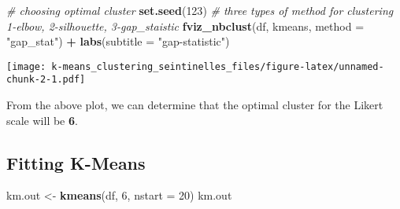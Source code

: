 \documentclass[
]{article}
\newenvironment{Shaded}{\begin{snugshade}}{\end{snugshade}}
\newcommand{\AttributeTok}[1]{\textcolor[rgb]{0.13,0.29,0.53}{#1}}
\newcommand{\CommentTok}[1]{\textcolor[rgb]{0.56,0.35,0.01}{\textit{#1}}}
\newcommand{\DecValTok}[1]{\textcolor[rgb]{0.00,0.00,0.81}{#1}}
\newcommand{\FunctionTok}[1]{\textcolor[rgb]{0.13,0.29,0.53}{\textbf{#1}}}
\newcommand{\NormalTok}[1]{#1}
\newcommand{\OtherTok}[1]{\textcolor[rgb]{0.56,0.35,0.01}{#1}}
\newcommand{\SpecialCharTok}[1]{\textcolor[rgb]{0.81,0.36,0.00}{\textbf{#1}}}
\newcommand{\StringTok}[1]{\textcolor[rgb]{0.31,0.60,0.02}{#1}}
\begin{document}
\begin{Shaded}
\begin{Highlighting}[]
\CommentTok{\# choosing optimal cluster}
\FunctionTok{set.seed}\NormalTok{(}\DecValTok{123}\NormalTok{)}
\CommentTok{\# three types of method for clustering 1{-}elbow, 2{-}silhouette, 3{-}gap\_staistic}
\FunctionTok{fviz\_nbclust}\NormalTok{(df, kmeans, }\AttributeTok{method =} \StringTok{"gap\_stat"}\NormalTok{) }\SpecialCharTok{+} \FunctionTok{labs}\NormalTok{(}\AttributeTok{subtitle =} \StringTok{"gap{-}statistic"}\NormalTok{) }
\end{Highlighting}
\end{Shaded}

\texttt{[image: k-means\_clustering\_seintinelles\_files/figure-latex/unnamed-chunk-2-1.pdf]}

From the above plot, we can determine that the optimal cluster for the
Likert scale will be \textbf{6}.

\hypertarget{fitting-k-means}{%
\subsection{Fitting K-Means}\label{fitting-k-means}}

\begin{Shaded}
\begin{Highlighting}[]
\NormalTok{km.out }\OtherTok{\textless{}{-}} \FunctionTok{kmeans}\NormalTok{(df, }\DecValTok{6}\NormalTok{, }\AttributeTok{nstart =} \DecValTok{20}\NormalTok{)}
\NormalTok{km.out}
\end{Highlighting}
\end{Shaded}
\end{document}
